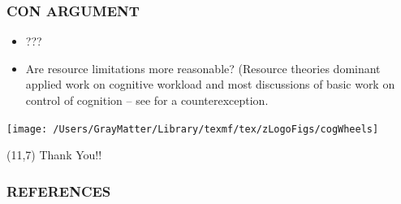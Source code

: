 \documentclass{beamer}
\begin{document}
\begin{frame}
	\frametitle{CON ARGUMENT}
	\begin{itemize}
		\item ???
		\item Are resource limitations more reasonable? (Resource theories dominant applied work on cognitive workload and most discussions of basic work on control of cognition -- see \textcite{erik08pr.article} for a counterexception.
	\end{itemize}
\end{frame}




\begin{frame}
	\texttt{[image: /Users/GrayMatter/Library/texmf/tex/zLogoFigs/cogWheels]}
	\begin{textblock}{4}(11,7)
		\LARGE{\textcolor{wdgRed}{Thank You!!}}
	\end{textblock}
		
\end{frame}

\begin{frame}[allowframebreaks]
	\frametitle{REFERENCES}
	\printbibliography
\end{frame}
\end{document}

